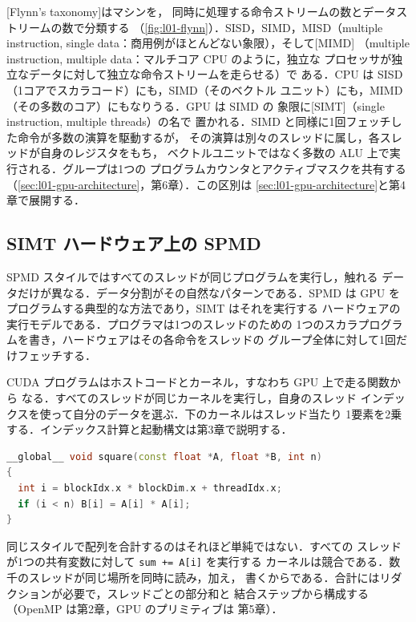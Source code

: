 \documentclass[../main.tex]{subfiles}
\begin{document}
[Flynn's taxonomy]はマシンを，
同時に処理する命令ストリームの数とデータストリームの数で分類する
（\cref{fig:l01-flynn}）．SISD，SIMD，MISD（multiple instruction,
single data：商用例がほとんどない象限），そして[MIMD]
（multiple instruction, multiple data：マルチコア CPU のように，独立な
プロセッサが独立なデータに対して独立な命令ストリームを走らせる）で
ある．CPU は SISD（1コアでスカラコード）にも，SIMD（そのベクトル
ユニット）にも，MIMD（その多数のコア）にもなりうる．GPU は SIMD の
象限に[SIMT]（single instruction, multiple threads）の名で
置かれる．SIMD と同様に1回フェッチした命令が多数の演算を駆動するが，
その演算は別々のスレッドに属し，各スレッドが自身のレジスタをもち，
ベクトルユニットではなく多数の ALU 上で実行される．グループは1つの
プログラムカウンタとアクティブマスクを共有する
（\cref{sec:l01-gpu-architecture}，第6章）．この区別は
\cref{sec:l01-gpu-architecture}と第4章で展開する．

\subsection{SIMT ハードウェア上の SPMD}

SPMD スタイルではすべてのスレッドが同じプログラムを実行し，触れる
データだけが異なる．データ分割がその自然なパターンである．SPMD は
GPU をプログラムする典型的な方法であり，SIMT はそれを実行する
ハードウェアの実行モデルである．プログラマは1つのスレッドのための
1つのスカラプログラムを書き，ハードウェアはその各命令をスレッドの
グループ全体に対して1回だけフェッチする．

CUDA プログラムはホストコードとカーネル，すなわち GPU 上で走る関数から
なる．すべてのスレッドが同じカーネルを実行し，自身のスレッド
インデックスを使って自分のデータを選ぶ．下のカーネルはスレッド当たり
1要素を2乗する．インデックス計算と起動構文は第3章で説明する．
\begin{lstlisting}[language=C++, numbers=none]
__global__ void square(const float *A, float *B, int n)
{
  int i = blockIdx.x * blockDim.x + threadIdx.x;
  if (i < n) B[i] = A[i] * A[i];
}
\end{lstlisting}
同じスタイルで配列を合計するのはそれほど単純ではない．すべての
スレッドが1つの共有変数に対して \texttt{sum += A[i]} を実行する
カーネルは競合である．数千のスレッドが同じ場所を同時に読み，加え，
書くからである．合計にはリダクションが必要で，スレッドごとの部分和と
結合ステップから構成する（OpenMP は第2章，GPU のプリミティブは
第5章）．
\end{document}
